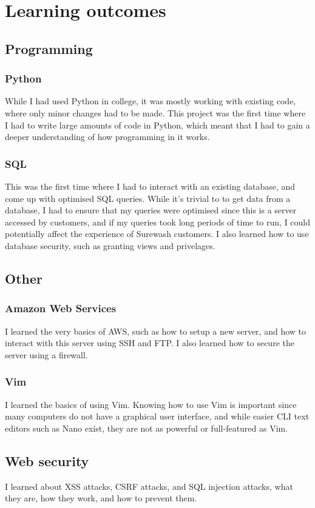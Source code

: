 \section{Learning outcomes}
    \subsection{Programming}
        \subsubsection{Python}
        While I had used Python in college, it was mostly working with existing code, where only minor changes had to be made. This project was the first time where I had to write large amounts of code in Python, which meant that I had to gain a deeper understanding of how programming in it works.
        \subsubsection{SQL}
        This was the first time where I had to interact with an existing database, and come up with optimised SQL queries. While it's trivial to to get data from a database, I had to ensure that my queries were optimised since this is a server accessed by customers, and if my queries took long periods of time to run, I could potentially affect the experience of Surewash customers. I also learned how to use database security, such as granting views and privelages.
    \subsection{Other}
        \subsubsection{Amazon Web Services}
        I learned the very basics of AWS, such as how to setup a new server, and how to interact with this server using SSH and FTP. I also learned how to secure the server using a firewall.
        \subsubsection{Vim}
        I learned the basics of using Vim. Knowing how to use Vim is important since many computers do not have a graphical user interface, and while easier CLI text editors such as Nano exist, they are not as powerful or full-featured as Vim.
        \subsection{Web security}
        I learned about XSS attacks, CSRF attacks, and SQL injection attacks, what they are, how they work, and how to prevent them.